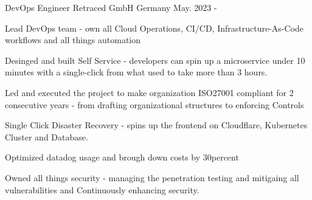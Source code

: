 

\begin{cventries}

  \cventry
    { DevOps Engineer } %
    {Retraced GmbH} %
    {Germany} %
    {May. 2023 - } %
    {
      \begin{cvitems} %
        \item {Lead DevOps team - own all Cloud Operations, CI/CD, Infrastructure-As-Code workflows and all things automation}
        \item {Desinged and built Self Service - developers can spin up a microservice under 10 minutes with a single-click  from what used to take more than 3 hours.}
        \item {Led and executed the project to make organization ISO27001 compliant for 2 consecutive years - from drafting organizational structures to enforcing Controls}
        \item {Single Click Disaster Recovery - spins up the frontend on Cloudflare, Kubernetes Cluster and Database. }
        \item {Optimized datadog usage and brough down costs by 30percent }
        \item {Owned all things security - managing the penetration testing and mitigaing all vulnerabilities and Continuously enhancing security.}
      \end{cvitems}
    }


\end{cventries}
